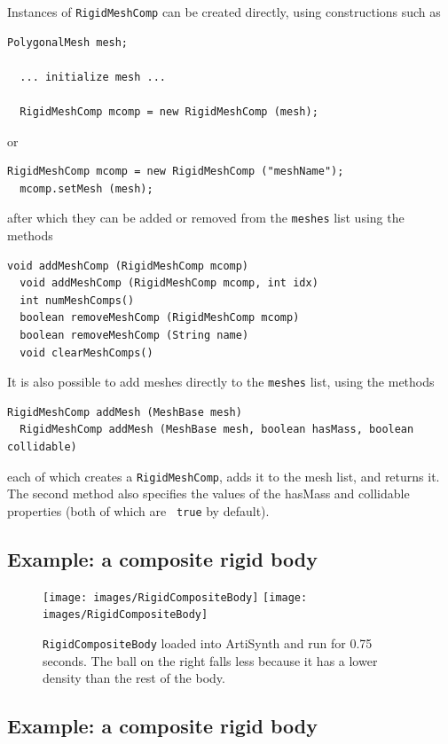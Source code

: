 Instances of {\tt RigidMeshComp} can be created directly, using
constructions such as
%
\begin{lstlisting}[]
  PolygonalMesh mesh;

  ... initialize mesh ...

  RigidMeshComp mcomp = new RigidMeshComp (mesh);
\end{lstlisting}
%
or
%
\begin{lstlisting}[]
  RigidMeshComp mcomp = new RigidMeshComp ("meshName");
  mcomp.setMesh (mesh);
\end{lstlisting}
%
after which they can be added or removed from the {\tt meshes} list
using the methods
\begin{lstlisting}[]
  void addMeshComp (RigidMeshComp mcomp)
  void addMeshComp (RigidMeshComp mcomp, int idx)
  int numMeshComps()
  boolean removeMeshComp (RigidMeshComp mcomp)
  boolean removeMeshComp (String name)
  void clearMeshComps()
\end{lstlisting}
%
It is also possible to add meshes directly to the {\tt meshes} list,
using the methods
\begin{lstlisting}[]
  RigidMeshComp addMesh (MeshBase mesh)
  RigidMeshComp addMesh (MeshBase mesh, boolean hasMass, boolean collidable)
\end{lstlisting}
%
each of which creates a {\tt RigidMeshComp}, adds it to the mesh list,
and returns it.  The second method also specifies the values of the
{\sf hasMass} and {\sf collidable} properties (both of which are {\tt
true} by default).

\iflatexml
\subsection{Example: a composite rigid body}
\fi

\begin{figure}[ht]
\begin{center}
\iflatexml
 \texttt{[image: images/RigidCompositeBody]}
\else
 \texttt{[image: images/RigidCompositeBody]}
\fi
\end{center}
\caption{{\tt RigidCompositeBody} loaded into ArtiSynth and run for 0.75 seconds.
The ball on the right falls less because it has a lower
density than the rest of the body.}
\label{RigidCompositeBody:fig}
\end{figure}

\iflatexml
\else
\subsection{Example: a composite rigid body}
\fi

